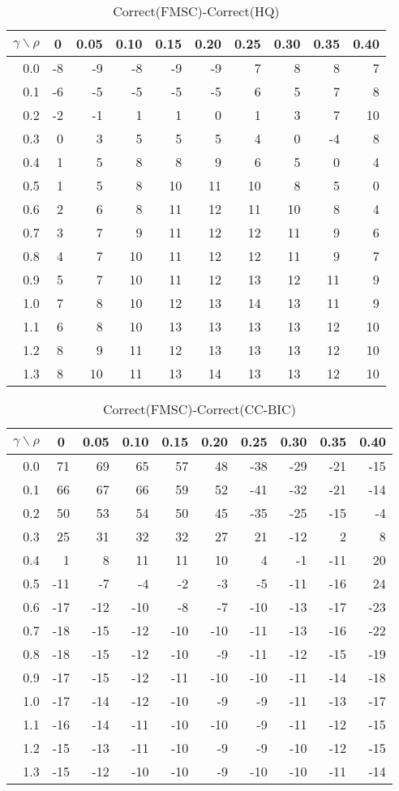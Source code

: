 \documentclass[12pt]{article}
\begin{document}
%
\begin{table}[!tbp]
\caption{Correct(FMSC)-Correct(HQ)}
 \begin{center}
 \begin{tabular}{r|rrrrrrrrr}\hline\hline
\multicolumn{1}{c|}{$\gamma\backslash\rho$}&\multicolumn{1}{c}{0}&\multicolumn{1}{c}{0.05}&\multicolumn{1}{c}{0.10}&\multicolumn{1}{c}{0.15}&\multicolumn{1}{c}{0.20}&\multicolumn{1}{c}{0.25}&\multicolumn{1}{c}{0.30}&\multicolumn{1}{c}{0.35}&\multicolumn{1}{c}{0.40}\tabularnewline
\hline
0.0&-8&-9&-8&-9&-9& 7& 8& 8& 7\tabularnewline
0.1&-6&-5&-5&-5&-5& 6& 5& 7& 8\tabularnewline
0.2&-2&-1& 1& 1& 0& 1& 3& 7&10\tabularnewline
0.3& 0& 3& 5& 5& 5& 4& 0&-4& 8\tabularnewline
0.4& 1& 5& 8& 8& 9& 6& 5& 0& 4\tabularnewline
0.5& 1& 5& 8&10&11&10& 8& 5& 0\tabularnewline
0.6& 2& 6& 8&11&12&11&10& 8& 4\tabularnewline
0.7& 3& 7& 9&11&12&12&11& 9& 6\tabularnewline
0.8& 4& 7&10&11&12&12&11& 9& 7\tabularnewline
0.9& 5& 7&10&11&12&13&12&11& 9\tabularnewline
1.0& 7& 8&10&12&13&14&13&11& 9\tabularnewline
1.1& 6& 8&10&13&13&13&13&12&10\tabularnewline
1.2& 8& 9&11&12&13&13&13&12&10\tabularnewline
1.3& 8&10&11&13&14&13&13&12&10\tabularnewline
\hline
\end{tabular}

\end{center}

\end{table}

%
\begin{table}[!tbp]
\caption{Correct(FMSC)-Correct(CC-BIC)}
 \begin{center}
 \begin{tabular}{r|rrrrrrrrr}\hline\hline
\multicolumn{1}{c|}{$\gamma\backslash\rho$}&\multicolumn{1}{c}{0}&\multicolumn{1}{c}{0.05}&\multicolumn{1}{c}{0.10}&\multicolumn{1}{c}{0.15}&\multicolumn{1}{c}{0.20}&\multicolumn{1}{c}{0.25}&\multicolumn{1}{c}{0.30}&\multicolumn{1}{c}{0.35}&\multicolumn{1}{c}{0.40}\tabularnewline
\hline
0.0& 71& 69& 65& 57& 48&-38&-29&-21&-15\tabularnewline
0.1& 66& 67& 66& 59& 52&-41&-32&-21&-14\tabularnewline
0.2& 50& 53& 54& 50& 45&-35&-25&-15& -4\tabularnewline
0.3& 25& 31& 32& 32& 27& 21&-12&  2&  8\tabularnewline
0.4&  1&  8& 11& 11& 10&  4& -1&-11& 20\tabularnewline
0.5&-11& -7& -4& -2& -3& -5&-11&-16& 24\tabularnewline
0.6&-17&-12&-10& -8& -7&-10&-13&-17&-23\tabularnewline
0.7&-18&-15&-12&-10&-10&-11&-13&-16&-22\tabularnewline
0.8&-18&-15&-12&-10& -9&-11&-12&-15&-19\tabularnewline
0.9&-17&-15&-12&-11&-10&-10&-11&-14&-18\tabularnewline
1.0&-17&-14&-12&-10& -9& -9&-11&-13&-17\tabularnewline
1.1&-16&-14&-11&-10&-10& -9&-11&-12&-15\tabularnewline
1.2&-15&-13&-11&-10& -9& -9&-10&-12&-15\tabularnewline
1.3&-15&-12&-10&-10& -9&-10&-10&-11&-14\tabularnewline
\hline
\end{tabular}

\end{center}

\end{table}
\end{document}
